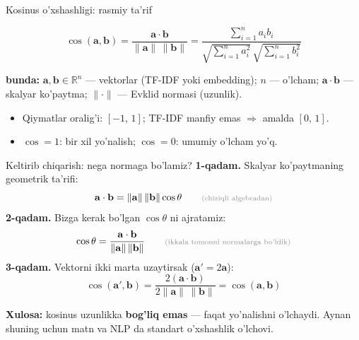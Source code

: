 \documentclass[aspectratio=169,11pt]{beamer}
\newcommand{\bunda}[1]{{\small\textbf{bunda:}\; #1}}
\begin{document}
\begin{frame}{Kosinus o'xshashligi: rasmiy ta'rif}
  \begin{tcolorbox}[defbox,title=Ta'rif: kosinus o'xshashligi (cosine similarity)]
    \vspace{-0.6em}
    $$\cos(\mathbf{a},\mathbf{b})
      = \frac{\mathbf{a}\cdot\mathbf{b}}
             {\lVert\mathbf{a}\rVert\,\lVert\mathbf{b}\rVert}
      = \frac{\sum_{i=1}^{n} a_i b_i}
             {\sqrt{\sum_{i=1}^{n} a_i^2}\,\sqrt{\sum_{i=1}^{n} b_i^2}}$$
  \end{tcolorbox}
  \vspace{0.2em}
  \bunda{$\mathbf{a},\mathbf{b}\in\mathbb{R}^n$ --- vektorlar
  (TF-IDF yoki embedding); $n$ --- o'lcham; $\mathbf{a}\cdot\mathbf{b}$
  --- skalyar ko'paytma; $\lVert\cdot\rVert$ --- Evklid normasi (uzunlik).}
  \vspace{0.5em}
  \begin{itemize}\small\setlength\itemsep{3pt}
    \item Qiymatlar oralig'i: $[-1,\,1]$; TF-IDF manfiy emas
          $\Rightarrow$ amalda $[0,\,1]$.
    \item $\cos = 1$: bir xil yo'nalish; $\cos = 0$: umumiy o'lcham yo'q.
  \end{itemize}
\end{frame}

\begin{frame}{Keltirib chiqarish: nega normaga bo'lamiz?}
  \textbf{1-qadam.} Skalyar ko'paytmaning geometrik ta'rifi:
  $$\mathbf{a}\cdot\mathbf{b}
    = \lVert\mathbf{a}\rVert\,\lVert\mathbf{b}\rVert\cos\theta
    \qquad\text{\scriptsize\color{halfgray}(chiziqli algebradan)}$$
  \pause
  \textbf{2-qadam.} Bizga kerak bo'lgan $\cos\theta$ ni ajratamiz:
  $$\cos\theta
    = \frac{\mathbf{a}\cdot\mathbf{b}}
           {\lVert\mathbf{a}\rVert\,\lVert\mathbf{b}\rVert}
    \qquad\text{\scriptsize\color{halfgray}(ikkala tomonni normalarga bo'ldik)}$$
  \pause
  \textbf{3-qadam.} Vektorni ikki marta uzaytirsak ($\mathbf{a}'=2\mathbf{a}$):
  $$\cos(\mathbf{a}',\mathbf{b})
    = \frac{2(\mathbf{a}\cdot\mathbf{b})}
           {2\lVert\mathbf{a}\rVert\,\lVert\mathbf{b}\rVert}
    = \cos(\mathbf{a},\mathbf{b})$$
  \begin{tcolorbox}[okbox]
    \small \textbf{Xulosa:} kosinus uzunlikka \textbf{bog'liq emas} ---
    faqat yo'nalishni o'lchaydi. Aynan shuning uchun matn va NLP da
    standart o'xshashlik o'lchovi.
  \end{tcolorbox}
\end{frame}
\end{document}
